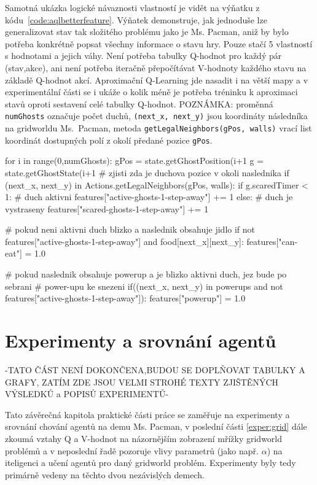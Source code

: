 Samotná ukázka logické návaznosti vlastností je vidět na výňatku z kódu~\ref{code:aqlbetterfeature}. Výňatek demonstruje, jak jednoduše lze generalizovat stav tak složitého problému jako je Ms. Pacman, aniž by bylo potřeba konkrétně popsat všechny informace o stavu hry. Pouze stačí 5 vlastností s hodnotami a jejich váhy. Není potřeba tabulky Q-hodnot pro každý pár (stav,akce), ani není potřeba iteračně přepočítávat V-hodnoty každého stavu na základě Q-hodnot akcí. Aproximační Q-Learning jde nasadit i na větší mapy a v experimentální části se i ukáže o kolik méně je potřeba tréninku k aproximaci stavů oproti sestavení celé tabulky Q-hodnot. \newline POZNÁMKA: proměnná \texttt{numGhosts} označuje počet duchů, \texttt{(next\_x, next\_y)} jsou koordináty následníka na gridworldu Ms.~Pacman, metoda \texttt{getLegalNeighbors(gPos, walls)} vrací list koordinát dostupných polí z okolí předané pozice \texttt{gPos}.
\begin{python}[label={code:aqlbetterfeature}]
for i in range(0,numGhosts):
   gPos = state.getGhostPosition(i+1%
   g = state.getGhostState(i+1%
   # zjisti zda je duchova pozice v okoli naslednika
   if (next_x, next_y) in Actions.getLegalNeighbors(gPos, walls):
      if g.scaredTimer < 1:   # duch aktivni
         features["active-ghosts-1-step-away"] += 1
      else:                   # duch je vystraseny
         features["scared-ghosts-1-step-away"] += 1

# pokud neni aktivni duch blizko a naslednik obsahuje jidlo
if not features["active-ghosts-1-step-away"] and food[next_x][next_y]:
   features["can-eat"] = 1.0

# pokud naslednik obsahuje powerup a je blizko aktivni duch, jez bude po sebrani
# power-upu ke snezeni
if((next_x, next_y) in powerups and not 
features["active-ghosts-1-step-away"]):
    features["powerup"] = 1.0
\end{python}

\chapter{Experimenty a srovnání agentů}
-TATO ČÁST NENÍ DOKONČENA,BUDOU SE DOPLŇOVAT TABULKY A GRAFY, ZATÍM ZDE JSOU VELMI STROHÉ TEXTY ZJIŠTĚNÝCH VÝSLEDKŮ a POPISŮ EXPERIMENTŮ-


Tato závěrečná kapitola praktické části práce se zaměřuje na experimenty a srovnání chování agentů na demu Ms. Pacman, v poslední části \ref{exper:grid} dále zkoumá vztahy Q a V-hodnot na názornějším zobrazení mřížky gridworld problémů a v neposlední řadě pozoruje vlivy parametrů (jako např. $\alpha$) na iteligenci a učení agentů pro daný gridworld problém. Experimenty byly tedy primárně vedeny na těchto dvou nezávislých demech.

